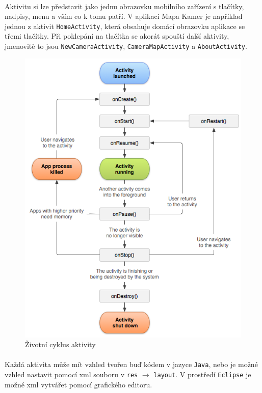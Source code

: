 \paragraph{}
Aktivitu si lze představit jako jednu obrazovku mobilního zařízení s tlačítky, nadpisy, menu a vším co k tomu patří. V aplikaci Mapa Kamer je například jednou z aktivit \texttt{HomeActivity}, která obsahuje domácí obrazovku aplikace se třemi tlačítky. Při poklepání na tlačítka se akorát spouští další aktivity, jmenovitě to jsou \texttt{NewCameraActivity}, \texttt{CameraMapActivity} a \texttt{AboutActivity}. 
\begin{figure}[!ht]
\begin{center}
\includegraphics[scale=0.3]{pics/activity_lifecycle.png}
\caption{Životní cyklus aktivity}
\end{center}
\end{figure}
\paragraph{}
Každá aktivita může mít vzhled tvořen buď kódem v jazyce \texttt{Java}, nebo je možné vzhled nastavit pomocí xml souboru v \texttt{res} $\rightarrow$ \texttt{layout}. V prostředí \texttt{Eclipse} je možné xml vytvářet pomocí grafického editoru. 
